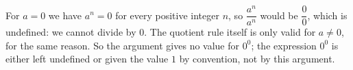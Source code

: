 For $a=0$ we have $a^n=0$ for every positive integer $n$, so $\dfrac{a^n}{a^n}$ would be $\dfrac00$, which is undefined: we cannot divide by $0$. The quotient rule itself is only valid for $a\ne0$, for the same reason. So the argument gives no value for $0^0$; the expression $0^0$ is either left undefined or given the value $1$ by convention, not by this argument.
